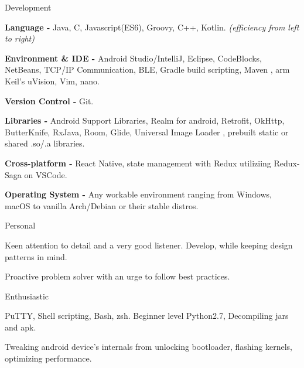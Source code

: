 

\begin{skillsentries}
  
  \skillsentry
    {Development} %
    {
      \begin{skillsitems} %
        \item {\textbf{Language -} Java, C, Javascript(ES6), Groovy, C++, Kotlin. \textsl{(efficiency from left to right)}}
        \item {\textbf{Environment \& IDE -} Android Studio/IntelliJ, Eclipse, CodeBlocks, NetBeans, TCP/IP Communication, BLE, Gradle build scripting, Maven
        , arm Keil's uVision, Vim, nano.}
        \item {\textbf{Version Control -} Git.}
        \item {\textbf{Libraries -} Android Support Libraries, Realm for android, Retrofit, OkHttp, ButterKnife, RxJava, Room, Glide, Universal Image Loader
        , prebuilt static or shared .so/.a libraries.}
        \item {\textbf{Cross-platform -} React Native, state management with Redux utiliziing Redux-Saga on VSCode.}
        \item {\textbf{Operating System - } Any workable environment ranging from Windows, macOS to vanilla Arch/Debian or their stable distros.}
      \end{skillsitems}
    }

    
    \skillsentry
    {Personal} %
    {
      \begin{skillsitems} %
        \item {Keen attention to detail and a very good listener. Develop, while keeping design patterns in mind.}
        \item {Proactive problem solver with an urge to follow best practices.}
      \end{skillsitems}
      }
      
      \skillsentry
      {Enthusiastic} %
      {
        \begin{skillsitems} %
          \item {PuTTY, Shell scripting, Bash, zsh. Beginner level Python2.7, Decompiling jars and apk.}
          \item {Tweaking android device's internals from unlocking bootloader, flashing kernels, optimizing performance.}
        \end{skillsitems}
      }
\end{skillsentries}
